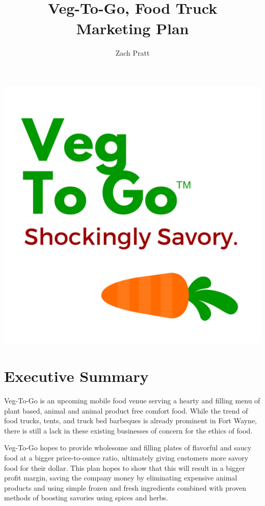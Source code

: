 \documentclass[12pt, letterpaper]{article}
\newcommand{\companyname}{Veg-To-Go}
\begin{document}
\includegraphics[width=\textwidth]{VegToGoLogo}

\newpage{}

\title{\companyname{},\textsuperscript{\texttrademark} Food Truck\\ Marketing Plan}
\author{Zach Pratt}
\maketitle

\newpage

\renewcommand\contentsname{Table of Contents}
\renewcommand{\cftsecleader}{\cftdotfill{\cftdotsep}}
\tableofcontents

\newpage

\section{Executive Summary}
Veg-To-Go is an upcoming mobile food venue serving a hearty and filling menu of plant based, animal and animal product free comfort food.  While the trend of food trucks, tents, and truck bed barbeques is already prominent in Fort Wayne, there is still a lack in these existing businesses of concern for the ethics of food.

Veg-To-Go hopes to provide wholesome and filling plates of flavorful and saucy food at a bigger price-to-ounce ratio, ultimately giving customers more savory food for their dollar.  This plan hopes to show that this will result in a bigger profit margin, saving the company money by eliminating expensive animal products and using simple frozen and fresh ingredients combined with proven methods of boosting savories using spices and herbs.
\end{document}
